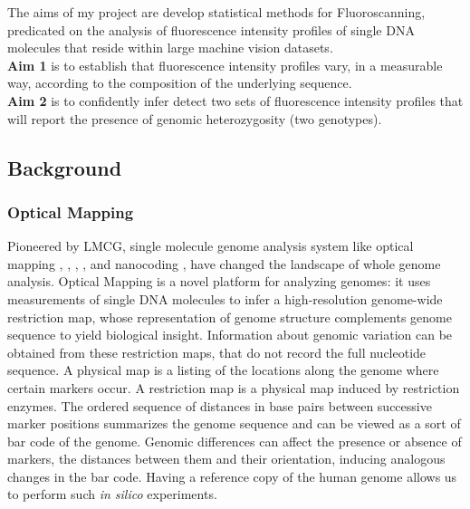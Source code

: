 The aims of my project are develop statistical methods for Fluoroscanning, predicated on the analysis of fluorescence intensity profiles of single DNA molecules that reside within large machine vision datasets.\\
\noindent
{\bf{Aim 1}} is to establish that fluorescence intensity profiles vary, in a measurable way, according to the composition of the underlying sequence. \\
\noindent
{\bf{Aim 2}} is to confidently infer detect two sets of fluorescence intensity profiles that will report the presence of genomic heterozygosity (two genotypes).

\subsection{Background}
\subsubsection*{Optical Mapping}
Pioneered by LMCG, single molecule genome analysis system like optical mapping \cite{Schwartz_etal_1993_Science}, \cite{Dimalanta_etal_2004_AnalChem}, \cite{Aston_etal_1999_Optical}, \cite{Teague_etal_2010_PNAS}, \cite{Yokota_etal_1997_NAR} and nanocoding \cite{Jo_etal_2007_PNAS}, \cite{Chen_etal_2005_Macromolecules} have changed the landscape of whole genome analysis. Optical Mapping is a novel platform for analyzing genomes: it uses measurements of single DNA molecules to infer a high-resolution genome-wide restriction map, whose representation of genome structure complements genome sequence to yield biological insight. Information about genomic variation can be obtained from these restriction maps, that do not record the full nucleotide sequence. A physical map is a listing of the locations along the genome where certain markers occur. A restriction map is a physical map induced by restriction enzymes. The ordered sequence of distances in base pairs between successive marker positions summarizes the genome sequence and can be viewed as a sort of bar code of the genome. Genomic differences can affect the presence or absence of markers, the distances between them and their orientation, inducing analogous changes in the bar code. Having a reference copy of the human genome allows us to perform such {\emph{in silico}} experiments. 

